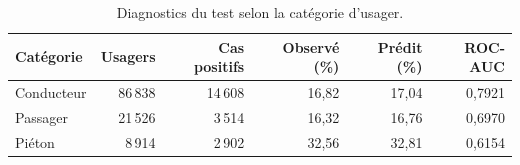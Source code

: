 \begin{table}[htbp]
\centering\small
\renewcommand{\arraystretch}{1.18}
\caption{Diagnostics du test selon la catégorie d'usager.}\label{tab:ml-groupes}
\begin{tabularx}{\textwidth}{@{}Lrrrrr@{}}
\toprule
Catégorie & Usagers & Cas positifs & Observé (\%) & Prédit (\%) & ROC-AUC \\
\midrule
Conducteur & 86\,838 & 14\,608 & 16,82 & 17,04 & 0,7921 \\
Passager & 21\,526 & 3\,514 & 16,32 & 16,76 & 0,6970 \\
Piéton & 8\,914 & 2\,902 & 32,56 & 32,81 & 0,6154 \\
\bottomrule
\end{tabularx}
\end{table}
